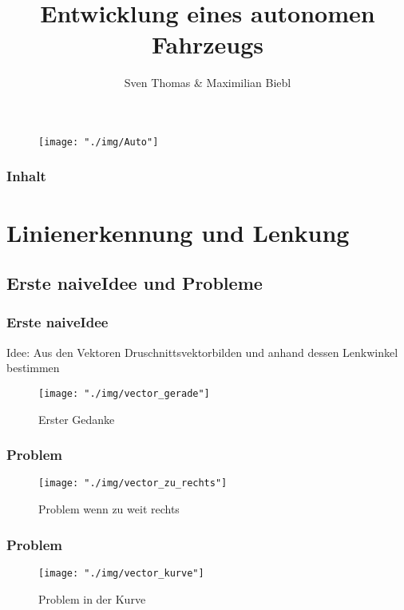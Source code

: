 \documentclass{beamer}
\title[]{Entwicklung eines autonomen Fahrzeugs}
\author{Sven Thomas \& Maximilian Biebl}
\institute[THM]{Technische Hochschule Mittelhessen}
\date{}
\begin{document}
	\begin{frame}
		\titlepage
			\begin{center}
				\begin{figure}[h]
					\texttt{[image: "./img/Auto"]}
					\label{fig:Auto}
				\end{figure}
			\end{center}
	\end{frame}

	\begin{frame}
		\frametitle{Inhalt}
		\tableofcontents
	\end{frame}

	\section{Linienerkennung und Lenkung}
	
	\subsection{Erste \glqq naive\grqq Idee und Probleme}

	\begin{frame}
		\frametitle{Erste \glqq naive\grqq  Idee}
		Idee: Aus den Vektoren \glqq Druschnittsvektor\grqq \space bilden  und anhand dessen Lenkwinkel bestimmen
		\begin{center}
			\begin{figure}[h]
				\texttt{[image: "./img/vector\_gerade"]}
				\caption{Erster Gedanke}
				\label{fig:Lenkung via Vektoren in Gerade}
			\end{figure}
		\end{center}
	\end{frame}

	\begin{frame}
		\frametitle{Problem}
		\begin{center}
			\begin{figure}[h]
				\texttt{[image: "./img/vector\_zu\_rechts"]}
				\caption{Problem wenn zu weit rechts}
				\label{fig:Lenkung via Vektoren zu weit rechts}
			\end{figure}
		\end{center}
	\end{frame}

	\begin{frame}
		\frametitle{Problem}
			\begin{center}
				\begin{figure}[h]
					\texttt{[image: "./img/vector\_kurve"]}
					\caption{Problem in der Kurve}
					\label{fig:Lenkung via Vektoren in Kurve}
				\end{figure}
			\end{center}
	\end{frame}
\end{document}
